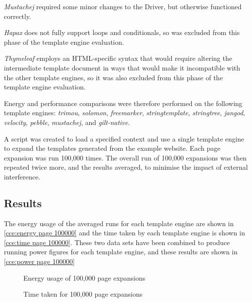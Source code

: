 \emph{Mustachej} required some minor changes to the Driver, but otherwise functioned correctly.

\emph{Hapax} does not fully support loops and conditionals, so was excluded from this phase of the \gls{template engine} evaluation.

\emph{Thymeleaf} employs an HTML-specific syntax that would require altering the intermediate template document in ways that would make it incompatible with the other \gls{template engine}s, so it was also excluded from this phase of the \gls{template engine} evaluation.

Energy and performance comparisons were therefore performed on the following \gls{template engine}s:
\emph{trimou},
\emph{solomon},
\emph{freemarker},
\emph{stringtemplate},
\emph{stringtree},
\emph{jangod},
\emph{velocity},
\emph{pebble},
\emph{mustachej},
and \emph{gilt-native}.

A script was created to load a specified context and use a single \gls{template engine} to expand the templates generated from the example website. Each page expansion was run 100,000 times. The overall run of 100,000 expansions was then repeated twice more, and the results averaged, to minimise the impact of external interference.

\subsection{Results}
\label{cce results}

The energy usage of the averaged runs for each \gls{template engine} are shown in \autoref{cce:energy page 100000} and the time taken by each \gls{template engine} is shown in \autoref{cce:time page 100000}. These two data sets have been combined to produce running power figures for each \gls{template engine}, and these results are shown in \autoref{cce:power page 100000}

\begin{figure}[htbp]
  \centering
  
  \caption{Energy usage of 100,000 page expansions}
  \label{cce:energy page 100000}
\end{figure}

\begin{figure}[htbp]
  \centering
  
  \caption{Time taken for 100,000 page expansions}
  \label{cce:time page 100000}
\end{figure}

